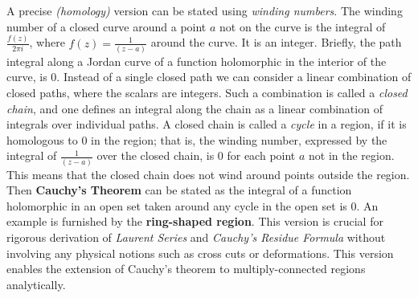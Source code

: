 \documentclass[article,12pt]{elsarticle}
\begin{document}
	A precise \textit{(homology)} version can be stated using \textit{winding numbers}. The winding number of a closed curve around a point $a$ not on the curve is the integral of $\frac{f(z)}{2\pi i}$, where $f(z) = \frac{1}{(z-a)}$ around the curve. It is an integer. Briefly, the path integral along a Jordan curve of a function holomorphic in the interior of the curve, is $0$. Instead of a single closed path we can consider a linear combination of closed paths, where the scalars are integers. Such a combination is called a \textit{closed chain}, and one defines an integral along the chain as a linear combination of integrals over individual paths. A closed chain is called a \textit{cycle} in a region, if it is homologous to $0$ in the region; that is, the winding number, expressed by the integral of $\frac{1}{(z-a)}$ over the closed chain, is $0$ for each point $a$ not in the region. This means that the closed chain does not wind around points outside the region. Then \textbf{Cauchy's Theorem} can be stated as the integral of a function holomorphic in an open set taken around any cycle in the open set is $0$. An example is furnished by the \textbf{ring-shaped region}. This version is crucial for rigorous derivation of \textit{Laurent Series} and \textit{Cauchy's Residue Formula} without involving any physical notions such as cross cuts or deformations. This version enables the extension of Cauchy's theorem to multiply-connected regions analytically.
	
\end{document}
